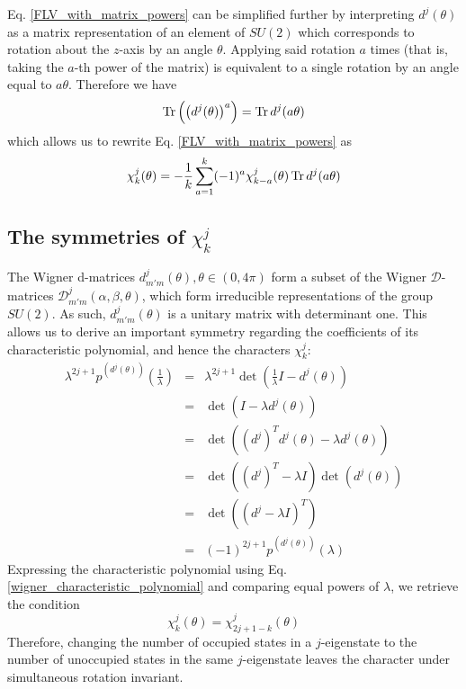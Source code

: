 \documentclass[12pt]{article}
\begin{document}
	Eq. \ref{FLV_with_matrix_powers} can be simplified further by interpreting $d^j(\theta)$ as a matrix representation of an element of $SU(2)$ which corresponds to rotation about the $z$-axis by an angle $\theta$. Applying said rotation $a$ times (that is, taking the $a$-th power of the matrix) is equivalent to a single rotation by an angle equal to $a\theta$. Therefore we have
	\begin{equation}
	\Tr\left(\left(d^j(\theta)\right)^a\right) = \Tr d^j(a\theta)
	\end{equation}
	which allows us to rewrite Eq. \ref{FLV_with_matrix_powers} as
	\begin{equation} \label{ensemble_character_recursive_relation}
	\chi^j_k(\theta)=-\frac{1}{k}\sum_{a=1}^k (-1)^{a}\chi^j_{k-a}(\theta)\Tr d^j(a\theta)
	\end{equation}
	
	\subsection{The symmetries of $\chi^j_k$}
	The Wigner d-matrices $d^j_{m'm}(\theta), \theta\in (0,4\pi)$ form a subset of the Wigner $\mathcal{D}$-matrices $\mathcal{D}^j_{m'm}(\alpha, \beta, \theta)$, which form irreducible representations of the group $SU(2)$. As such, $d^j_{m'm}(\theta)$ is a unitary matrix with determinant one. This allows us to derive an important symmetry regarding the coefficients of its characteristic polynomial, and hence the characters $\chi^j_k$:
	\begin{eqnarray}
	\lambda^{2j+1}p^{\left(d^j(\theta)\right)}\left(\frac{1}{\lambda}\right) &=& \lambda^{2j+1}\det(\frac{1}{\lambda}I-d^j(\theta))\\
	&=& \det(I-\lambda d^j(\theta))\\
	&=& \det(\left(d^j\right)^Td^j(\theta)-\lambda d^j(\theta))\\
	&=& \det(\left(d^j\right)^T-\lambda I)\det(d^j(\theta))\\
	&=& \det(\left(d^j-\lambda I\right)^T)\\
	&=& (-1)^{2j+1}p^{\left(d^j(\theta)\right)}(\lambda)
	\end{eqnarray}
	Expressing the characteristic polynomial using Eq. \ref{wigner_characteristic_polynomial} and comparing equal powers of $\lambda$, we retrieve the condition
	\begin{equation} \label{flip_k_by_two_j_plus_one}
	\chi^j_k(\theta)=\chi^j_{2j+1-k}(\theta)
	\end{equation}
	Therefore, changing the number of occupied states in a $j$-eigenstate to the number of unoccupied states in the same $j$-eigenstate leaves the character under simultaneous rotation invariant.
	
\end{document}
